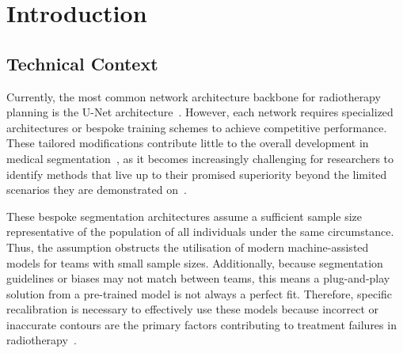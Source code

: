 \documentclass[11pt,twoside]{report}
\begin{document}
\tableofcontents
  


\setcounter{page}{1}
\fancyhead[LE,RO]{\slshape \rightmark}
\fancyhead[LO,RE]{\slshape \leftmark}

\chapter{Introduction}

\section{Technical Context}



Currently, the most common network architecture backbone for radiotherapy planning is the U-Net architecture~\cite{Samarasinghe2021-ps, Lin2021-oz, Sartor2020-et, LIU2020184, Rhee2020-ms, LIU2020172}. However, each network requires specialized architectures or bespoke training schemes to achieve competitive performance. These tailored modifications contribute little to the overall development in medical segmentation~\cite{isensee2024nnunet}, as it becomes increasingly challenging for researchers to identify methods that live up to their promised superiority beyond the limited scenarios they are demonstrated on~\cite{nnunet}.

These bespoke segmentation architectures assume a sufficient sample size representative of the population of all individuals under the same circumstance. Thus, the assumption obstructs the utilisation of modern machine-assisted models for teams with small sample sizes. Additionally, because segmentation guidelines or biases may not match between teams, this means a plug-and-play solution from a pre-trained model is not always a perfect fit. Therefore, specific recalibration is necessary to effectively use these models because incorrect or inaccurate contours are the primary factors contributing to treatment failures in radiotherapy~\cite{Rhee2020-ms}.
\end{document}
